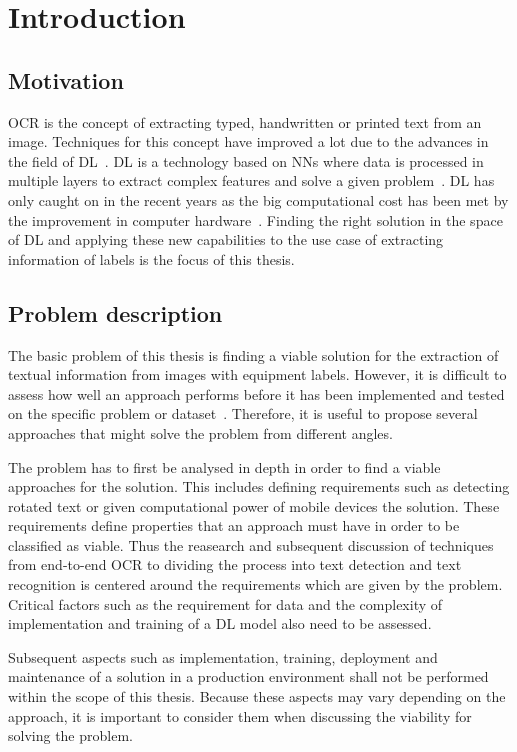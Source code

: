 \chapter{Introduction}\label{ch:intro}
\section{Motivation}
\ac{OCR} is the concept of extracting typed, handwritten or printed text
from an image.
Techniques for this concept have improved a lot due to the advances in the field of
\ac{DL}~\cite{zhao_improving_2020}.
\ac{DL} is a technology based on \acp{NN} where data is processed
in multiple layers to extract complex features and solve a given problem~\cite{shrestha_review_2019}.
\ac{DL} has only caught on in the recent years as the big computational cost has been met
by the improvement in computer hardware~\cite{ponti_everything_2017}.
Finding the right solution in the space of \ac{DL} and applying these new capabilities to
the use case of extracting information of labels is the focus of this thesis.

\section{Problem description}\label{se:problem}
The basic problem of this thesis is finding a viable solution for the extraction of textual
information from images with equipment labels.
However, it is difficult to assess how well an approach performs before it has been implemented and
tested on the specific problem or dataset~\cite{arpteg_software_2018}.
Therefore, it is useful to propose several approaches that might solve the problem from
different angles.

The problem has to first be analysed in depth in order to find a viable approaches for the solution.
This includes defining requirements such as detecting rotated text or given computational power
of mobile devices the solution.
These requirements define properties that an approach must have in order to be classified as viable.
Thus the reasearch and subsequent discussion of techniques from end-to-end \ac{OCR} to dividing the
process into text detection and text recognition is centered around the requirements which are
given by the problem.
Critical factors such as the requirement for data and the complexity of implementation and training
of a \ac{DL} model also need to be assessed.

Subsequent aspects such as implementation, training, deployment and maintenance of a solution in a
production environment shall not be performed within the scope of this thesis.
Because these aspects may vary depending on the approach, it is important to consider them when
discussing the viability for solving the problem.

